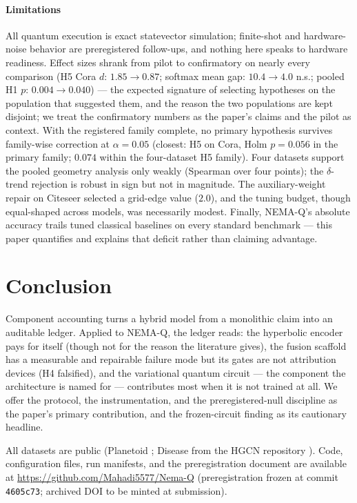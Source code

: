 \documentclass[pdflatex,sn-mathphys-num]{sn-jnl}
\begin{document}
\paragraph{Limitations} All quantum execution is exact statevector simulation; finite-shot and hardware-noise behavior are preregistered follow-ups, and nothing here speaks to hardware readiness. Effect sizes shrank from pilot to confirmatory on nearly every comparison (H5 Cora $d$: $1.85 \to 0.87$; softmax mean gap: $10.4 \to 4.0$ n.s.; pooled H1 $p$: $0.004 \to 0.040$) --- the expected signature of selecting hypotheses on the population that suggested them, and the reason the two populations are kept disjoint; we treat the confirmatory numbers as the paper's claims and the pilot as context. With the registered family complete, no primary hypothesis survives family-wise correction at $\alpha=0.05$ (closest: H5 on Cora, Holm $p=0.056$ in the primary family; $0.074$ within the four-dataset H5 family). Four datasets support the pooled geometry analysis only weakly (Spearman over four points); the $\delta$-trend rejection is robust in sign but not in magnitude. The auxiliary-weight repair on Citeseer selected a grid-edge value ($2.0$), and the tuning budget, though equal-shaped across models, was necessarily modest. Finally, NEMA-Q's absolute accuracy trails tuned classical baselines on every standard benchmark --- this paper quantifies and explains that deficit rather than claiming advantage.

\section{Conclusion}\label{sec:conclusion}

Component accounting turns a hybrid model from a monolithic claim into an auditable ledger. Applied to NEMA-Q, the ledger reads: the hyperbolic encoder pays for itself (though not for the reason the literature gives), the fusion scaffold has a measurable and repairable failure mode but its gates are not attribution devices (H4 falsified), and the variational quantum circuit --- the component the architecture is named for --- contributes most when it is not trained at all. We offer the protocol, the instrumentation, and the preregistered-null discipline as the paper's primary contribution, and the frozen-circuit finding as its cautionary headline.

\backmatter

All datasets are public (Planetoid \cite{yang2016planetoid}; Disease from the HGCN repository \cite{chami2019hgcn}). Code, configuration files, run manifests, and the preregistration document are available at \url{https://github.com/Mahadi5577/Nema-Q} (preregistration frozen at commit \texttt{4605c73}; archived DOI to be minted at submission).
\end{document}
